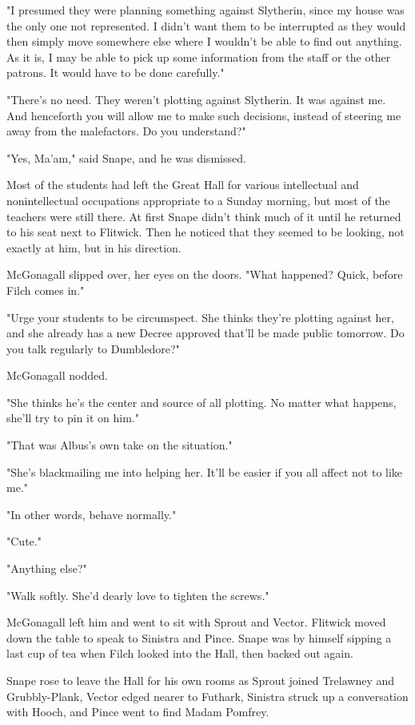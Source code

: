 \documentclass[a4paper,11pt]{article}
\begin{document}
"I presumed they were planning something against Slytherin, since my house was the only one not represented. I didn't want them to be interrupted as they would then simply move somewhere else where I wouldn't be able to find out anything. As it is, I may be able to pick up some information from the staff or the other patrons. It would have to be done carefully."

"There's no need. They weren't plotting against Slytherin. It was against me. And henceforth you will allow me to make such decisions, instead of steering me away from the malefactors. Do you understand?"

"Yes, Ma'am," said Snape, and he was dismissed.

Most of the students had left the Great Hall for various intellectual and nonintellectual occupations appropriate to a Sunday morning, but most of the teachers were still there. At first Snape didn't think much of it until he returned to his seat next to Flitwick. Then he noticed that they seemed to be looking, not exactly at him, but in his direction.

McGonagall slipped over, her eyes on the doors. "What happened? Quick, before Filch comes in."

"Urge your students to be circumspect. She thinks they're plotting against her, and she already has a new Decree approved that'll be made public tomorrow. Do you talk regularly to Dumbledore?"

McGonagall nodded.

"She thinks he's the center and source of all plotting. No matter what happens, she'll try to pin it on him."

"That was Albus's own take on the situation."

"She's blackmailing me into helping her. It'll be easier if you all affect not to like me."

"In other words, behave normally."

"Cute."

"Anything else?"

"Walk softly. She'd dearly love to tighten the screws."

McGonagall left him and went to sit with Sprout and Vector. Flitwick moved down the table to speak to Sinistra and Pince. Snape was by himself sipping a last cup of tea when Filch looked into the Hall, then backed out again.

Snape rose to leave the Hall for his own rooms as Sprout joined Trelawney and Grubbly-Plank, Vector edged nearer to Futhark, Sinistra struck up a conversation with Hooch, and Pince went to find Madam Pomfrey.
\end{document}
